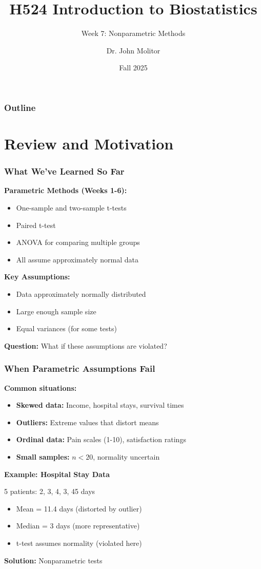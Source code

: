 \documentclass{beamer}
\title{H524 Introduction to Biostatistics}
\subtitle{Week 7: Nonparametric Methods}
\author{Dr. John Molitor}
\institute{}
\date{Fall 2025}
\begin{document}
\begin{frame}[plain]
\titlepage
\end{frame}

\begin{frame}
\frametitle{Outline}
\tableofcontents
\end{frame}

\section{Review and Motivation}

\begin{frame}
\frametitle{What We've Learned So Far}
\textbf{Parametric Methods (Weeks 1-6):}
\begin{itemize}
\item One-sample and two-sample t-tests
\item Paired t-test
\item ANOVA for comparing multiple groups
\item All assume approximately normal data
\end{itemize}

\vspace{0.5cm}
\textbf{Key Assumptions:}
\begin{itemize}
\item Data approximately normally distributed
\item Large enough sample size
\item Equal variances (for some tests)
\end{itemize}

\vspace{0.5cm}
\textbf{Question:} What if these assumptions are violated?
\end{frame}

\begin{frame}
\frametitle{When Parametric Assumptions Fail}
\textbf{Common situations:}
\begin{itemize}
\item \textbf{Skewed data:} Income, hospital stays, survival times
\item \textbf{Outliers:} Extreme values that distort means
\item \textbf{Ordinal data:} Pain scales (1-10), satisfaction ratings
\item \textbf{Small samples:} $n < 20$, normality uncertain
\end{itemize}

\vspace{0.5cm}
\textbf{Example: Hospital Stay Data}

5 patients: 2, 3, 4, 3, 45 days

\begin{itemize}
\item Mean = 11.4 days (distorted by outlier)
\item Median = 3 days (more representative)
\item t-test assumes normality (violated here)
\end{itemize}

\vspace{0.3cm}
\textbf{Solution:} Nonparametric tests
\end{frame}
\end{document}
